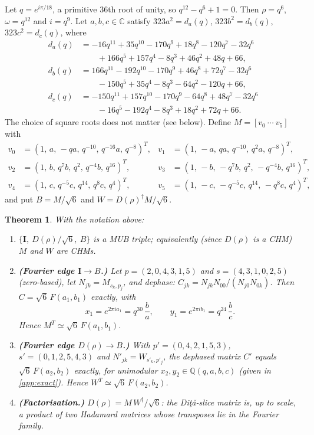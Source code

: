 \documentclass[11pt]{article}
\numberwithin{equation}{section}
\theoremstyle{plain}
\newtheorem{theorem}{Theorem}[section]
\theoremstyle{definition}
\theoremstyle{remark}
\newcommand{\C}{\mathbb{C}}
\newcommand{\Q}{\mathbb{Q}}
\newcommand{\I}{\mathbf{I}}
\newcommand{\dg}{^{\dagger}}
\newcommand{\Dita}{\texorpdfstring{Di\c{t}\u{a}}{Dita}}
\begin{document}
Let $q=e^{i\pi/18}$, a primitive $36$th root of unity, so $q^{12}-q^6+1=0$. Then $\rho=q^6$, $\omega=q^{12}$ and $i=q^9$. Let $a,b,c\in\C$ satisfy $323a^2=d_a(q)$, $323b^2=d_b(q)$, $323c^2=d_c(q)$, where
\begin{align*}
d_a(q)&=-16q^{11}+35q^{10}-170q^9+18q^8-120q^7-32q^6\\&\qquad+166q^5+157q^4-8q^3+46q^2+48q+66,\\
d_b(q)&=166q^{11}-192q^{10}-170q^9+46q^8+72q^7-32q^6\\&\qquad-150q^5+35q^4-8q^3-64q^2-120q+66,\\
d_c(q)&=-150q^{11}+157q^{10}-170q^9-64q^8+48q^7-32q^6\\&\qquad-16q^5-192q^4-8q^3+18q^2+72q+66.
\end{align*}
The choice of square roots does not matter (see below). Define $M=[v_0\ \cdots\ v_5]$ with
\begin{align*}
v_0&=(1,\,a,\,-qa,\,q^{-10},\,q^{-16}a,\,q^{-8})^{T}, &
v_1&=(1,\,-a,\,qa,\,q^{-10},\,q^{2}a,\,q^{-8})^{T},\\
v_2&=(1,\,b,\,q^7b,\,q^2,\,q^{-4}b,\,q^{16})^{T}, &
v_3&=(1,\,-b,\,-q^7b,\,q^2,\,-q^{-4}b,\,q^{16})^{T},\\
v_4&=(1,\,c,\,q^{-5}c,\,q^{14},\,q^8c,\,q^4)^{T}, &
v_5&=(1,\,-c,\,-q^{-5}c,\,q^{14},\,-q^8c,\,q^4)^{T},
\end{align*}
and put $B=M/\sqrt6$ and $W=D(\rho)\dg M/\sqrt6$.

\begin{theorem}\label{thm:main}
With the notation above:
\begin{enumerate}
\item $\{\I,\ D(\rho)/\sqrt6,\ B\}$ is a MUB triple; equivalently (since $D(\rho)$ is a CHM) $M$ and $W$ are CHMs.
\item \textbf{(Fourier edge $\I\to B$.)} Let $p=(2,0,4,3,1,5)$ and $s=(4,3,1,0,2,5)$ (zero-based), let $N_{jk}=M_{s_k,p_j}$, and dephase: $C_{jk}=N_{jk}N_{00}/(N_{j0}N_{0k})$. Then $C=\sqrt6\,F(a_1,b_1)$ exactly, with
\[
x_1=e^{2\pi ia_1}=q^{30}\,\frac{b}{a},\qquad y_1=e^{2\pi ib_1}=q^{24}\,\frac{b}{c}.
\]
Hence $M^{T}\simeq\sqrt6\,F(a_1,b_1)$.
\item \textbf{(Fourier edge $D(\rho)\to B$.)} With $p'=(0,4,2,1,5,3)$, $s'=(0,1,2,5,4,3)$ and $N'_{jk}=W_{s'_k,p'_j}$, the dephased matrix $C'$ equals $\sqrt6\,F(a_2,b_2)$ exactly, for unimodular $x_2,y_2\in\Q(q,a,b,c)$ (given in \cref{app:exact}). Hence $W^{T}\simeq\sqrt6\,F(a_2,b_2)$.
\item \textbf{(Factorisation.)} $D(\rho)=M\,W\dg/\sqrt6$: the \Dita{}-slice matrix is, up to scale, a product of two Hadamard matrices whose transposes lie in the Fourier family.
\end{enumerate}
\end{theorem}
\end{document}
